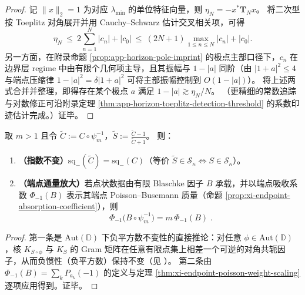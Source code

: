 \begin{proof}
记 \(\|x\|_2=1\) 为对应 \(\lambda_{\min}\) 的单位特征向量，则
\(
\eta_N=-x^\ast\mathbf{T}_N x
\)。
将二次型按 Toeplitz 对角展开并用 Cauchy--Schwarz 估计交叉相关项，可得
\[
\eta_N\ \le\ 2\sum_{n=1}^{N}|c_n|+|c_0|
\ \le\ (2N+1)\max_{1\le n\le N}|c_n|+|c_0|.
\]
另一方面，在附录命题 \ref{prop:app-horizon-pole-imprint} 的极点主部口径下，\(c_n\) 在边界层 regime 中由有限个几何项主导，且其振幅与 \(1-|a|\) 同阶（由 \(|1+a|^2\le 4\) 与端点压缩律 \(1-|a|^2=\delta|1+a|^2\) 可将主部振幅控制到 \(O(1-|a|)\)）。
将上述两式合并并整理，即得存在某个极点 \(a\) 满足 \(1-|a|\gtrsim \eta_N/N\)。
（更精细的常数追踪与对数修正可沿附录定理 \ref{thm:app-horizon-toeplitz-detection-threshold} 的系数印迹估计完成。）证毕。
\end{proof}

\begin{theorem}\label{thm:xi-index-flux-two-laws}
取 \(m>1\) 且令 \(\widetilde C:=C\circ\psi_m^{-1}\)，\(\widetilde S:=\frac{\widetilde C-1}{\widetilde C+1}\)。
则：
\begin{enumerate}
  \item \textbf{（指数不变）}\(\mathrm{sq}_-(\widetilde C)=\mathrm{sq}_-(C)\)（等价 \(\widetilde S\in\mathcal{S}_{\kappa}\iff S\in\mathcal{S}_{\kappa}\)）。
  \item \textbf{（端点通量放大）}若点状数据由有限 Blaschke 因子 \(B\) 承载，并以端点吸收系数 \(\Phi_{-1}(B)\) 表示其端点 Poisson--Busemann 质量（命题 \ref{prop:xi-endpoint-absorption-coefficient}），则
  \[
  \boxed{\;
  \Phi_{-1}\!\bigl(B\circ\psi_m^{-1}\bigr)=m\,\Phi_{-1}(B)\; }.
  \]
\end{enumerate}
\end{theorem}

\begin{proof}
第一条是 \(\mathrm{Aut}(\mathbb{D})\) 下负平方数不变性的直接推论：对任意 \(\phi\in\mathrm{Aut}(\mathbb{D})\)，核 \(K_{S\circ\phi}\) 与 \(K_S\) 的 Gram 矩阵在任意有限点集上相差一个可逆的对角共轭因子，从而负惯性（负平方数）保持不变（见 \cite{AlpayDijksmaRovnyakDeSnoo1997SchurPontryagin}）。
第二条由 \(\Phi_{-1}(B)=\sum_k P_{a_k}(-1)\) 的定义与定理 \ref{thm:xi-endpoint-poisson-weight-scaling} 逐项应用得到。证毕。
\end{proof}

